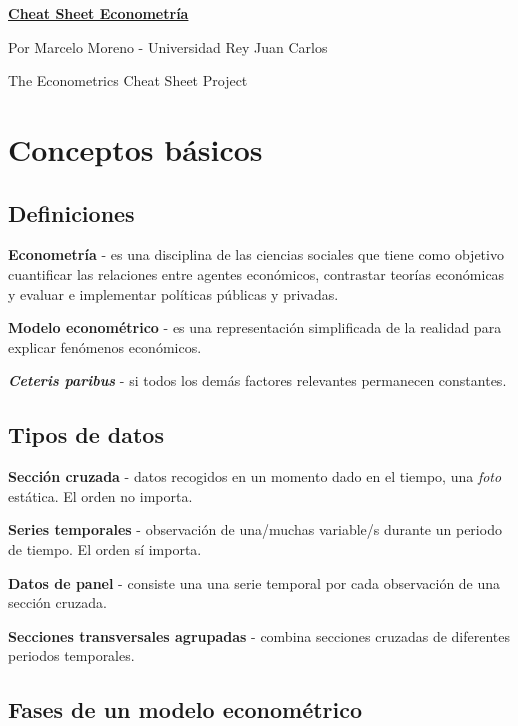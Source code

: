 \documentclass[10pt, a4paper, landscape]{article}
\begin{document}
	\begin{multicols}{3}
		\begin{center}
			\textbf{\LARGE \href{https://github.com/marcelomijas/econometrics-cheatsheet}{Cheat Sheet Econometría}}
			
			{\footnotesize Por Marcelo Moreno - Universidad Rey Juan Carlos}
			
			{\footnotesize The Econometrics Cheat Sheet Project}
		\end{center}
		
		\section*{Conceptos básicos}
		
		\subsection*{Definiciones}
		
		\textbf{Econometría} - es una disciplina de las ciencias sociales que tiene como objetivo cuantificar las relaciones entre agentes económicos, contrastar teorías económicas y evaluar e implementar políticas públicas y privadas.
		
		\textbf{Modelo econométrico} - es una representación simplificada de la realidad para explicar fenómenos económicos.
		
		\textbf{\textsl{Ceteris paribus}} - si todos los demás factores relevantes permanecen constantes.
		
		\subsection*{Tipos de datos}
		
		\textbf{Sección cruzada} - datos recogidos en un momento dado en el tiempo, una \textsl{foto} estática. El orden no importa.
		
		\textbf{Series temporales} - observación de una/muchas variable/s durante un periodo de tiempo. El orden sí importa.
		
		\textbf{Datos de panel} - consiste una una serie temporal por cada observación de una sección cruzada.
		
		\textbf{Secciones transversales agrupadas} - combina secciones cruzadas de diferentes periodos temporales.
		
		\subsection*{Fases de un modelo econométrico}
		

\end{multicols}
\end{document}
